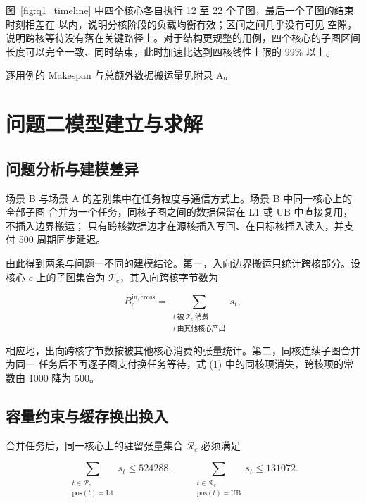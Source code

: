 \documentclass[bwprint]{gmcmthesis}
\begin{document}
图~\ref{fig:q1_timeline} 中四个核心各自执行 12 至 22 个子图，最后一个子图的结束
时刻相差在 \TimelineGap 以内，说明分核阶段的负载均衡有效；区间之间几乎没有可见
空隙，说明跨核等待没有落在关键路径上。对于结构更规整的用例，四个核心的子图区间
长度可以完全一致、同时结束，此时加速比达到四核线性上限的 99\% 以上。

逐用例的 Makespan 与总额外数据搬运量见附录 A。

\section{问题二模型建立与求解}

\subsection{问题分析与建模差异}

场景 B 与场景 A 的差别集中在任务粒度与通信方式上。场景 B 中同一核心上的全部子图
合并为一个任务，同核子图之间的数据保留在 L1 或 UB 中直接复用，不插入边界搬运；
只有跨核数据边才在源核插入写回、在目标核插入读入，并支付 500 周期同步延迟。

由此得到两条与问题一不同的建模结论。第一，入向边界搬运只统计跨核部分。设核心 $c$
上的子图集合为 $\mathcal{T}_c$，其入向跨核字节数为

\begin{equation}
B^{\mathrm{in,cross}}_c=\sum_{\substack{t\ \text{被}\ \mathcal{T}_c\ \text{消费}\\
t\ \text{由其他核心产出}}} s_t,
\end{equation}

相应地，出向跨核字节数按被其他核心消费的张量统计。第二，同核连续子图合并为同一
任务后不再逐子图支付换任务等待，式 (1) 中的同核项消失，跨核项的常数由 1000 降为
500。

\subsection{容量约束与缓存换出换入}

合并任务后，同一核心上的驻留张量集合 $\mathcal{R}_c$ 必须满足

\begin{equation}
\sum_{\substack{t\in\mathcal{R}_c\\ \mathrm{pos}(t)=\mathrm{L1}}} s_t\le 524288,
\qquad
\sum_{\substack{t\in\mathcal{R}_c\\ \mathrm{pos}(t)=\mathrm{UB}}} s_t\le 131072 .
\end{equation}
\end{document}
